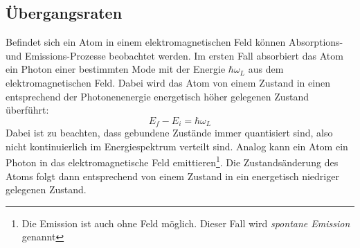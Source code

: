 \subsection{Übergangsraten}\label{subsec:uebergangsraten}
Befindet sich ein Atom in einem elektromagnetischen Feld können Absorptions- und
Emissions-Prozesse beobachtet werden. Im ersten Fall absorbiert das Atom ein
Photon einer bestimmten Mode mit der Energie $\hbar\omega_L$ aus dem elektromagnetischen Feld.
Dabei wird das Atom von einem Zustand in einen entsprechend der Photonenenergie
energetisch höher gelegenen Zustand überführt:
\begin{equation}\label{eq:uebergang}
	E_f-E_i=\hbar\omega_L
\end{equation}
Dabei ist zu beachten, dass gebundene Zustände immer quantisiert sind, also
nicht kontinuierlich im Energiespektrum verteilt sind. Analog kann ein Atom ein
Photon in das elektromagnetische Feld emittieren\footnote{Die Emission ist
auch ohne Feld möglich. Dieser Fall wird \textit{spontane Emission} genannt}.
Die Zustandsänderung des Atoms folgt dann entsprechend von einem Zustand in ein energetisch niedriger gelegenen Zustand.\par


